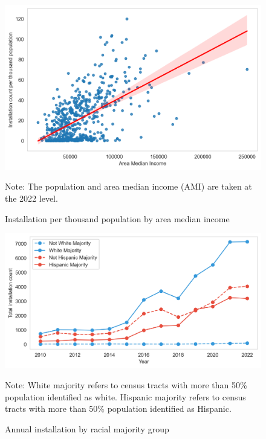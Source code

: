 \documentclass[12pt,twoside,letterpaper]{article}
\begin{document}
\begin{figure}[!ht]
    \centering
\includegraphics[width=1\textwidth]{figures/population_ami_count.png}
    \caption{Installation per thousand population by area median income}
    \label{fig:tract_map}
        \begin{flushleft}
        \footnotesize Note: The population and area median income (AMI) are taken at the 2022 level.
    \end{flushleft}
\end{figure}

\begin{figure}[!ht]
    \centering
\includegraphics[width=1\textwidth]{figures/installation_by_race.png}
    \caption{Annual installation by racial majority group}
    \label{fig:installation_race}
        \begin{flushleft}
        \footnotesize Note: White majority refers to census tracts with more than 50\% population identified as white. Hispanic majority refers to census tracts with more than 50\% population identified as Hispanic. 
    \end{flushleft}
\end{figure}
\end{document}
